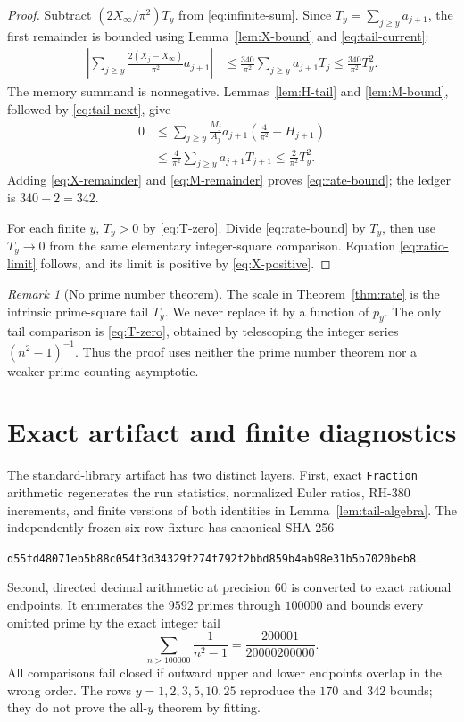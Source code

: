 \documentclass[11pt]{article}
\theoremstyle{definition}
\theoremstyle{remark}
\newtheorem{remark}[theorem]{Remark}
\begin{document}
\begin{proof}
Subtract $(2X_\infty/\pi^2)T_y$ from
\eqref{eq:infinite-sum}.  Since $T_y=\sum_{j\ge y}a_{j+1}$, the first
remainder is bounded using Lemma~\ref{lem:X-bound} and
\eqref{eq:tail-current}:
\begin{align}
\left|\sum_{j\ge y}\frac{2(X_j-X_\infty)}{\pi^2}a_{j+1}\right|
&\le\frac{340}{\pi^2}\sum_{j\ge y}a_{j+1}T_j
\le\frac{340}{\pi^2}T_y^2.
\label{eq:X-remainder}
\end{align}
The memory summand is nonnegative.  Lemmas~\ref{lem:H-tail} and
\ref{lem:M-bound}, followed by \eqref{eq:tail-next}, give
\begin{align}
0&\le\sum_{j\ge y}\frac{M_j}{A_j}a_{j+1}
 \left(\frac4{\pi^2}-H_{j+1}\right)\\
&\le\frac4{\pi^2}\sum_{j\ge y}a_{j+1}T_{j+1}
\le\frac2{\pi^2}T_y^2.
\label{eq:M-remainder}
\end{align}
Adding \eqref{eq:X-remainder} and \eqref{eq:M-remainder} proves
\eqref{eq:rate-bound}; the ledger is $340+2=342$.

For each finite $y$, $T_y>0$ by \eqref{eq:T-zero}.  Divide
\eqref{eq:rate-bound} by $T_y$, then use $T_y\to0$ from the same elementary
integer-square comparison.  Equation \eqref{eq:ratio-limit} follows, and
its limit is positive by \eqref{eq:X-positive}.
\end{proof}

\begin{remark}[No prime number theorem]
The scale in Theorem~\ref{thm:rate} is the intrinsic prime-square tail
$T_y$.  We never replace it by a function of $p_y$.  The only tail
comparison is \eqref{eq:T-zero}, obtained by telescoping the integer series
$(n^2-1)^{-1}$.  Thus the proof uses neither the prime number theorem nor a
weaker prime-counting asymptotic.
\end{remark}

\section{Exact artifact and finite diagnostics}

The standard-library artifact has two distinct layers.  First, exact
\texttt{Fraction} arithmetic regenerates the run statistics, normalized
Euler ratios, RH-380 increments, and finite versions of both identities in
Lemma~\ref{lem:tail-algebra}.  The independently frozen six-row fixture has
canonical SHA-256
\begin{center}
\texttt{d55fd48071eb5b88c054f3d34329f274f792f2bbd859b4ab98e31b5b7020beb8}.
\end{center}
Second, directed decimal arithmetic at precision $60$ is converted to
exact rational endpoints.  It enumerates the $9592$ primes through
$100000$ and bounds every omitted prime by the exact integer tail
\begin{equation}
 \sum_{n>100000}\frac1{n^2-1}
 =\frac{200001}{20000200000}.
 \label{eq:numeric-tail}
\end{equation}
All comparisons fail closed if outward upper and lower endpoints overlap in
the wrong order.  The rows $y=1,2,3,5,10,25$ reproduce the $170$ and $342$
bounds; they do not prove the all-$y$ theorem by fitting.
\end{document}
